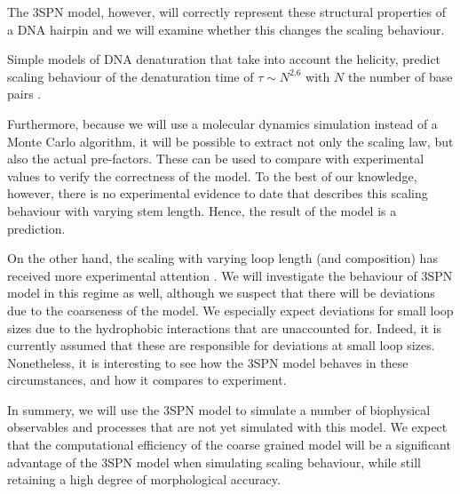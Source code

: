 The 3SPN model, however, will correctly represent these structural properties of a DNA hairpin and we will examine whether this changes the scaling behaviour. 

Simple models of DNA denaturation that take into account the helicity, predict scaling behaviour of the denaturation time of $\tau \sim N^{2.6}$ with $N$ the number of base pairs \cite{carlon2010unwinding}. 

Furthermore, because we will use a molecular dynamics simulation instead of a Monte Carlo algorithm, it will be possible to extract not only the scaling law, but also the actual pre-factors. These can be used to compare with experimental values to verify the correctness of the model. To the best of our knowledge, however, there is no experimental evidence to date that describes this scaling behaviour with varying stem length. Hence, the result of the model is a prediction.

On the other hand, the scaling with varying loop length (and composition) has received more experimental attention \cite{bonnet1998kinetics}. We will investigate the behaviour of 3SPN model in this regime as well, although we suspect that there will be deviations due to the coarseness of the model. We especially expect deviations for small loop sizes due to the hydrophobic interactions that are unaccounted for. Indeed, it is currently assumed \cite{vallone1999melting, shen2001loop} that these are responsible for deviations at small loop sizes. Nonetheless, it is interesting to see how the 3SPN model behaves in these circumstances, and how it compares to experiment.

In summery, we will use the 3SPN model to simulate a number of biophysical observables and processes that are not yet simulated with this model. We expect that the computational efficiency of the coarse grained model will be a significant advantage of the 3SPN model when simulating scaling behaviour, while still retaining a high degree of morphological accuracy.
